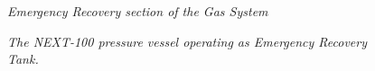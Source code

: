 \begin{figure}[hpt!]
    \bigskip
    \begin{center}\leavevmode
        \caption{\textit{Emergency Recovery section of the Gas System}}
        \label{fig.GER}
    \end{center}
\end{figure}


\begin{figure}[hpt!]
    \bigskip
    \begin{center}\leavevmode
        \caption{\textit{The NEXT-100 pressure vessel operating as Emergency Recovery Tank.}}
        \label{fig.N100}
    \end{center}
\end{figure}

